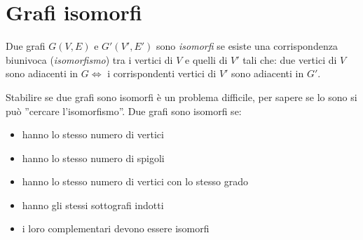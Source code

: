 \section{Grafi isomorfi}
\begin{defn}
Due grafi $G(V,E)$ e $G'(V',E')$ sono \emph{isomorfi} se esiste una corrispondenza biunivoca
(\emph{isomorfismo}) tra i vertici di $V$ e quelli di $V'$ tali che: due vertici di $V$ sono
adiacenti in $G \iff $ i corrispondenti vertici di $V'$ sono adiacenti in $G'$. 
\end{defn}
Stabilire se due grafi sono isomorfi è un problema difficile, per 
sapere se lo sono si può ''cercare l'isomorfismo''.
Due grafi sono isomorfi se:
\begin{itemize}
    \item hanno lo stesso numero di vertici
    \item hanno lo stesso numero di spigoli
    \item hanno lo stesso numero di vertici con lo stesso grado
    \item hanno gli stessi sottografi indotti
    \item i loro complementari devono essere isomorfi
\end{itemize}

